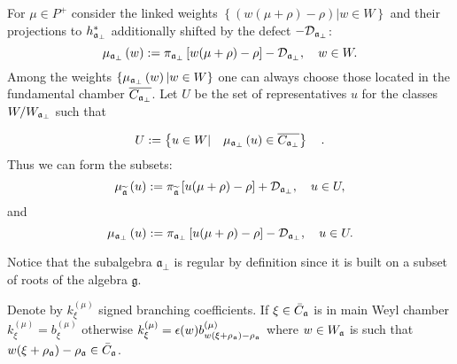 For $\mu \in P^{+}$ consider the linked weights $\left\{ \left(
w(\mu +\rho )-\rho \right) |w\in W\right\} $ and their projections
to
$h_{\mathfrak{a}_{\bot}}^{\ast }$ additionally shifted by the defect $-%
\mathcal{D}_{\afb}$:
\begin{equation*}
\mu _{\mathfrak{a}_{\bot}}\left( w\right) :=\pi _{\mathfrak{a}_{\bot}}\left[
w(\mu +\rho )-\rho \right] -\mathcal{D}_{\mathfrak{a}_{\bot}},\quad w\in W.
\end{equation*}
Among the weights $\left\{ \mu _{\mathfrak{a}_{\perp
}}\left( w\right) |w\in W\right\} $ one can always choose those located in
the fundamental chamber $\overline{C_{\mathfrak{a}_{\bot}}}$. Let $U$ be the
set of representatives $u$ for the classes $W/W_{\mathfrak{a}_{\bot}}$ such
that

\begin{equation}
U:=\left\{ u\in W|\quad \mu _{\mathfrak{a}_{\bot}}\left( u\right) \in
\overline{C_{\mathfrak{a}_{\bot}}}\right\} \quad .  \label{U-def}
\end{equation}
Thus we can form the subsets:
\begin{equation}
\mu _{\widetilde{\mathfrak{a}}}\left( u\right) :=\pi _{\widetilde{%
\mathfrak{a}}}\left[ u(\mu +\rho )-\rho \right] +\mathcal{D}_{\af%
_{\perp }},\quad u\in U,  \label{mu-a}
\end{equation}
and
\begin{equation}
\mu _{\mathfrak{a}_{\bot}}\left( u\right) :=\pi _{\mathfrak{a}_{\bot}}\left[
u(\mu +\rho )-\rho \right] -\mathcal{D}_{\mathfrak{a}_{\bot}},\quad u\in U.
\label{mu-a-tilda}
\end{equation}

Notice that the subalgebra $\mathfrak{a}_{\bot}$ is regular by definition
since it is built on a subset of roots of the algebra $\mathfrak{g}$.

Denote by  $k_{\xi }^{\left( \mu \right) }$ signed branching coefficients. If $\xi\in \bar C_{\mathfrak{a}}$ is in main Weyl chamber $k_{\xi}^{(\mu)}=b^{(\mu)}_{\xi}$ otherwise $k_{\xi}^{(\mu)}=\epsilon(w) b^{(\mu)}_{w (\xi+\rho_{\mathfrak{a}})-\rho_{\mathfrak{a}}}$ where $w\in W_{\mathfrak{a}}$ is such that $w (\xi+\rho_{\mathfrak{a}})-\rho_{\mathfrak{a}}\in \bar C_{\mathfrak{a}}$. 

